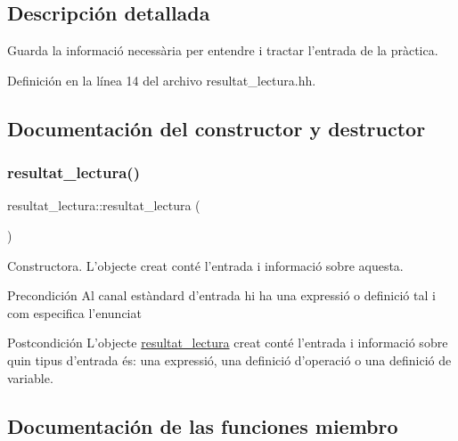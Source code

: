 \subsection{Descripción detallada}
Guarda la informació necessària per entendre i tractar l’entrada de la pràctica. 

Definición en la línea 14 del archivo resultat\+\_\+lectura.\+hh.



\subsection{Documentación del constructor y destructor}
\hypertarget{classresultat__lectura_a73ef39653019fabadde9454451121b3f}{}\label{classresultat__lectura_a73ef39653019fabadde9454451121b3f} 
\subsubsection{\texorpdfstring{resultat\+\_\+lectura()}{resultat\_lectura()}}
{\footnotesize\ttfamily resultat\+\_\+lectura\+::resultat\+\_\+lectura (\begin{DoxyParamCaption}{ }\end{DoxyParamCaption})}



Constructora. L’objecte creat conté l’entrada i informació sobre aquesta. 

\begin{DoxyPrecond}{Precondición}
Al canal estàndard d’entrada hi ha una expressió o definició tal i com especifica l’enunciat 
\end{DoxyPrecond}
\begin{DoxyPostcond}{Postcondición}
L’objecte \hyperlink{classresultat__lectura}{resultat\+\_\+lectura} creat conté l’entrada i informació sobre quin tipus d’entrada és\+: una expressió, una definició d’operació o una definició de variable. 
\end{DoxyPostcond}


\subsection{Documentación de las funciones miembro}
\hypertarget{classresultat__lectura_a4c84ef4ddea623e7a680c639c084d11d}{}\label{classresultat__lectura_a4c84ef4ddea623e7a680c639c084d11d} 
